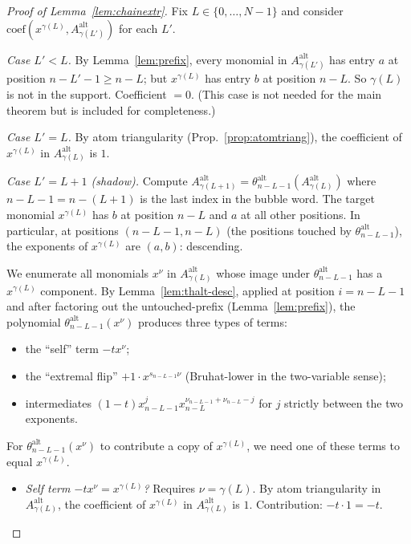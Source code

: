 \documentclass[11pt]{article}
\newcommand{\Aalt}{A^{\mathrm{alt}}}
\newcommand{\thalt}{\theta^{\mathrm{alt}}}
\begin{document}
\begin{proof}[Proof of Lemma~\ref{lem:chainextr}]
Fix $L \in \{0, \ldots, N-1\}$ and consider $\mathrm{coef}(x^{\gamma(L)}, \Aalt_{\gamma(L')})$
for each $L'$.

\emph{Case $L' < L$.}  By Lemma~\ref{lem:prefix}, every monomial in
$\Aalt_{\gamma(L')}$ has entry $a$ at position $n - L' - 1 \ge n - L$; but
$x^{\gamma(L)}$ has entry $b$ at position $n - L$.  So $\gamma(L)$ is not
in the support.  Coefficient $=0$. (This case is not needed for the main
theorem but is included for completeness.)

\emph{Case $L' = L$.}  By atom triangularity (Prop.~\ref{prop:atomtriang}),
the coefficient of $x^{\gamma(L)}$ in $\Aalt_{\gamma(L)}$ is $1$.

\emph{Case $L' = L + 1$ (shadow).}  Compute
$\Aalt_{\gamma(L+1)} = \thalt_{n-L-1}(\Aalt_{\gamma(L)})$
where $n - L - 1 = n - (L+1)$ is the last index in the bubble word.
The target monomial $x^{\gamma(L)}$ has $b$ at position $n - L$ and $a$
at all other positions.  In particular, at positions $(n-L-1, n-L)$
(the positions touched by $\thalt_{n-L-1}$), the exponents of
$x^{\gamma(L)}$ are $(a, b)$: descending.

We enumerate all monomials $x^\nu$ in $\Aalt_{\gamma(L)}$ whose image
under $\thalt_{n-L-1}$ has a $x^{\gamma(L)}$ component.  By
Lemma~\ref{lem:thalt-desc}, applied at position $i = n - L - 1$ and
after factoring out the untouched-prefix (Lemma~\ref{lem:prefix}), the
polynomial $\thalt_{n-L-1}(x^\nu)$ produces three types of terms:
\begin{itemize}
\item the ``self'' term $-t x^\nu$;
\item the ``extremal flip'' $+1 \cdot x^{s_{n-L-1} \nu}$ (Bruhat-lower
in the two-variable sense);
\item intermediates $(1-t) x_{n-L-1}^j x_{n-L}^{\nu_{n-L-1} + \nu_{n-L} - j}$
for $j$ strictly between the two exponents.
\end{itemize}

For $\thalt_{n-L-1}(x^\nu)$ to contribute a copy of $x^{\gamma(L)}$, we
need one of these terms to equal $x^{\gamma(L)}$.

\begin{itemize}
\item \emph{Self term $-t x^\nu = x^{\gamma(L)}$?} Requires $\nu = \gamma(L)$.
By atom triangularity in $\Aalt_{\gamma(L)}$, the coefficient of
$x^{\gamma(L)}$ in $\Aalt_{\gamma(L)}$ is $1$.  Contribution: $-t \cdot 1 = -t$.


\end{itemize}
\end{proof}
\end{document}
